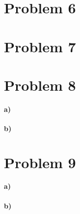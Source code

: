 \documentclass[12pt]{article}
\begin{document}
\section*{Problem 6}

\section*{Problem 7}

\section*{Problem 8}

\paragraph{a)}

\paragraph{b)}

\section*{Problem 9}

\paragraph{a)}

\paragraph{b)}
\end{document}
